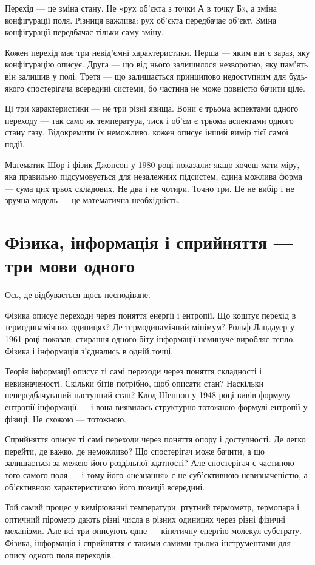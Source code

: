 \documentclass[12pt, a4paper, openany]{book}
\begin{document}
Перехід --- це зміна стану. Не «рух об'єкта з точки А в точку Б», а зміна конфігурації поля. Різниця важлива: рух об'єкта передбачає об'єкт. Зміна конфігурації передбачає тільки саму зміну.

Кожен перехід має три невід'ємні характеристики. Перша --- яким він є зараз, яку конфігурацію описує. Друга --- що від нього залишилося незворотно, яку пам'ять він залишив у полі. Третя --- що залишається принципово недоступним для будь-якого спостерігача всередині системи, бо частина не може повністю бачити ціле.

Ці три характеристики — не три різні явища. Вони є трьома аспектами одного переходу --- так само як температура, тиск і об'єм є трьома аспектами одного стану газу. Відокремити їх неможливо, кожен описує інший вимір тієї самої події.

Математик Шор і фізик Джонсон у 1980 році показали: якщо хочеш мати міру, яка правильно підсумовується для незалежних підсистем, єдина можлива форма --- сума цих трьох складових. Не два і не чотири. Точно три. Це не вибір і не зручна модель --- це математична необхідність.

\section{Фізика, інформація і сприйняття --- три мови одного}

Ось, де відбувається щось несподіване.

Фізика описує переходи через поняття енергії і ентропії. Що коштує перехід в термодинамічних одиницях? Де термодинамічний мінімум? Рольф Ландауер у 1961 році показав: стирання одного біту інформації неминуче виробляє тепло. Фізика і інформація з'єднались в одній точці.

Теорія інформації описує ті самі переходи через поняття складності і невизначеності. Скільки бітів потрібно, щоб описати стан? Наскільки непередбачуваний наступний стан? Клод Шеннон у 1948 році вивів формулу ентропії інформації --- і вона виявилась структурно тотожною формулі ентропії у фізиці. Не схожою --- тотожною.

Сприйняття описує ті самі переходи через поняття опору і доступності. Де легко перейти, де важко, де неможливо? Що спостерігач може бачити, а що залишається за межею його роздільної здатності? Але спостерігач є частиною того самого поля --- і тому його «незнання» є не суб'єктивною невизначеністю, а об'єктивною характеристикою його позиції всередині.

\begin{analogybox}
Той самий процес у вимірюванні температури: ртутний термометр, термопара і оптичний пірометр дають різні числа в різних одиницях через різні фізичні механізми. Але всі три описують одне --- кінетичну енергію молекул субстрату. Фізика, інформація і сприйняття є такими самими трьома інструментами для опису одного поля переходів.
\end{analogybox}
\end{document}
